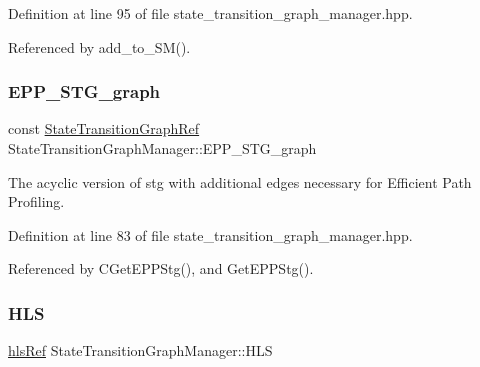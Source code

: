 Definition at line 95 of file state\+\_\+transition\+\_\+graph\+\_\+manager.\+hpp.



Referenced by add\+\_\+to\+\_\+\+S\+M().

\mbox{\label{classStateTransitionGraphManager_ade0364ea48b923b9ecdac9f9bd955797}} 
\subsubsection{\texorpdfstring{E\+P\+P\+\_\+\+S\+T\+G\+\_\+graph}{EPP\_STG\_graph}}
{\footnotesize\ttfamily const \hyperlink{state__transition__graph_8hpp_a50ba60cd5e113de254d5d7638bbbba86}{State\+Transition\+Graph\+Ref} State\+Transition\+Graph\+Manager\+::\+E\+P\+P\+\_\+\+S\+T\+G\+\_\+graph\hspace{0.3cm}{\ttfamily [private]}}



The acyclic version of stg with additional edges necessary for Efficient Path Profiling. 



Definition at line 83 of file state\+\_\+transition\+\_\+graph\+\_\+manager.\+hpp.



Referenced by C\+Get\+E\+P\+P\+Stg(), and Get\+E\+P\+P\+Stg().

\mbox{\label{classStateTransitionGraphManager_a53c457064906c1b6c3c0a8e8a05664a6}} 
\subsubsection{\texorpdfstring{H\+LS}{HLS}}
{\footnotesize\ttfamily \hyperlink{hls_8hpp_a75d0c73923d0ddfa28c4843a802c73a7}{hls\+Ref} State\+Transition\+Graph\+Manager\+::\+H\+LS\hspace{0.3cm}{\ttfamily [private]}}



